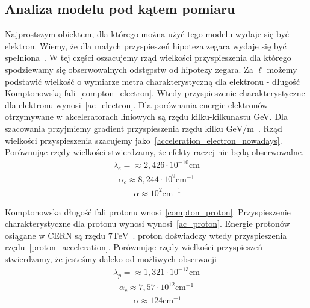 \subsection{Analiza modelu pod kątem pomiaru}
Najprostszym obiektem, dla którego można użyć tego modelu wydaje się
być elektron. Wiemy, że dla małych przyspieszeń hipoteza zegara
wydaje się być spełniona~\cite{}. W tej części oszacujemy rząd 
wielkości przyspieszenia dla którego spodziewamy się 
obserwowalnych odstępstw od hipotezy zegara.
Za $\ell$ możemy podstawić wielkość o wymiarze metra 
charakterystyczną dla elektronu - długość 
Komptonowską fali~\eqref{compton_electron}. 
Wtedy przyspieszenie charakterystyczne dla elektronu 
wynosi~\eqref{ac_electron}.
Dla porównania energie elektronów otrzymywane 
w akceleratorach liniowych są rzędu kilku-kilkunastu GeV.
Dla szacowania przyjmiemy gradient przyspieszenia rzędu
kilku $ \si{\giga\electronvolt \per \metre}$~\cite{Ghotra2015}.
Rząd wielkości przyspieszenia 
szacujemy jako~\eqref{acceleration_electron_nowadays}.
Porównując rzędy wielkości stwierdzamy, że efekty 
raczej nie będą obserwowalne.
\begin{align}\label{compton_electron}
\lambda_e = \approx 2,426 \cdot 10^{-10} \si{\centi\metre}
\end{align}
\begin{align}\label{ac_electron}
\alpha_c \approx 8,244\cdot 10^{9} \si{ \centi\metre^{-1}}
\end{align}
\begin{align}~\label{acceleration_electron_nowadays}
\alpha \approx 10^2 \si{\centi\metre^{-1}}
\end{align}

Komptonowska długość fali protonu wnosi~\eqref{compton_proton}. 
Przyspieszenie charakterystyczne dla protonu wynosi
wynosi~\eqref{ac_proton}.
Energie protonów osiągane w CERN są rzędu 
$7 \si{\tera\electronvolt}$~\cite{CERN}. 
proton doświadczy wtedy przyspieszenia
rzędu~\eqref{proton_acceleration}.
Porównując rzędy wielkości przyspieszeń stwierdzamy, 
że jesteśmy daleko od możliwych obserwacji
\begin{align}\label{compton_proton}
\lambda_p = \approx 1,321 \cdot 10^{-13} \si{\centi\metre}
\end{align}
\begin{align}\label{ac_proton}
\alpha_c \approx 7,57 \cdot 10^{12} \si{ \centi\metre^{-1}}
\end{align}
\begin{align}~\label{proton_acceleration}
\alpha \approx 124  \si{\centi\metre^{-1}}
\end{align}
